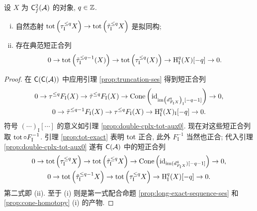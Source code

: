 \begin{lemma}\label{prop:double-cplx-tot-aux}
	设 $X$ 为 $\mathsf{C}^2_f(\mathcal{A})$ 的对象, $q \in \mathbb{Z}$.
	\begin{enumerate}[(i)]
		\item 自然态射 $\operatorname{tot}\left(\tau_{\mathrm{I}}^{\leq q} X\right) \to \operatorname{tot}\left(\tilde{\tau}_{\mathrm{I}}^{\leq q} X\right)$ 是拟同构;
		\item 存在典范短正合列
		\[ 0 \to \operatorname{tot}\left( \tilde{\tau}_{\mathrm{I}}^{\leq q-1} (X) \right) \to \operatorname{tot}\left( \tau_{\mathrm{I}}^{\leq q}(X) \right) \to \operatorname{H}_{\mathrm{I}}^q(X)[-q] \to 0. \]
	\end{enumerate}
\end{lemma}
\begin{proof}
	在 $\mathsf{C}(\mathsf{C}(\mathcal{A}))$ 中应用引理 \ref{prop:truncation-ses} 得到短正合列
	\begin{gather*}
		0 \to \tau^{\leq q} F_{\mathrm{I}} (X) \to \tilde{\tau}^{\leq q} F_{\mathrm{I}} (X) \to \operatorname{Cone}\left( \mathrm{id}_{\operatorname{im}\left( d^q_{F_{\mathrm{I}} X} \right)_{\mathrm{I}} [-q-1]} \right) \to 0, \\
		0 \to \tilde{\tau}^{\leq q-1} F_{\mathrm{I}}(X) \to \tau^{\leq q} F_{\mathrm{I}}(X) \to \operatorname{H}^q_{\mathrm{I}}(X)_{\mathrm{I}}[-q] \to 0.
	\end{gather*}
	符号 $(\cdots)_{\mathrm{I}}[\cdots]$ 的意义如引理 \ref{prop:double-cplx-tot-aux0}. 现在对这些短正合列取 $\operatorname{tot} \circ F_{\mathrm{I}}^{-1}$. 引理 \ref{prop:tot-exact} 表明 $\operatorname{tot}$ 正合, 此外 $F_{\mathrm{I}}^{-1}$ 当然也正合; 代入引理 \ref{prop:double-cplx-tot-aux0} 遂有 $\mathsf{C}(\mathcal{A})$ 中的短正合列
	\begin{gather*}
		0 \to \operatorname{tot}\left(\tau_{\mathrm{I}}^{\leq q} X\right) \to \operatorname{tot}\left( \tilde{\tau}_{\mathrm{I}}^{\leq q} X \right) \to \operatorname{Cone}\left( \mathrm{id}_{\operatorname{im}( d_{F_{\mathrm{I}} X}^q )[-q-1]} \right) \to 0, \\
		0 \to \operatorname{tot}\left( \tilde{\tau}_{\mathrm{I}}^{\leq q-1} X \right) \to \operatorname{tot}\left( \tau_{\mathrm{I}}^{\leq q}X \right) \to \operatorname{H}_{\mathrm{I}}^q(X)[-q] \to 0.
	\end{gather*}
	第二式即 (ii). 至于 (i) 则是第一式配合命题 \ref{prop:long-exact-sequence-ses} 和 \ref{prop:cone-homotopy} (i) 的产物.
\end{proof}

